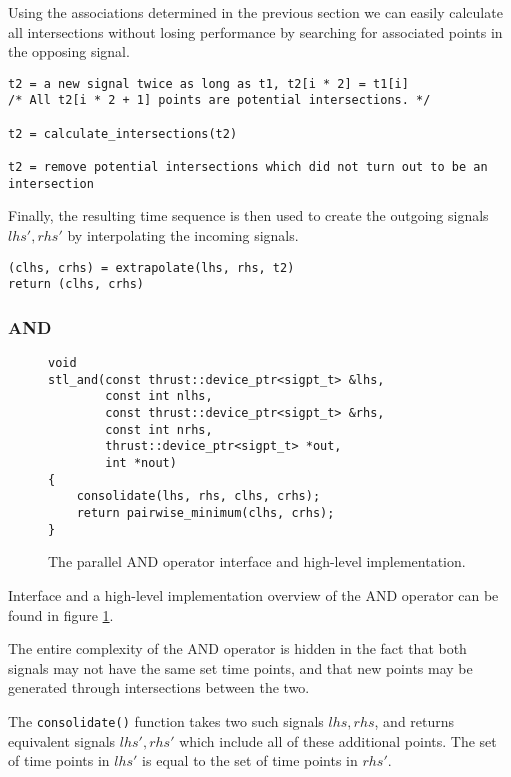 \documentclass[a4paper,10pt]{article}
\begin{document}
Using the associations determined in the previous section we can easily calculate
all intersections without losing performance by searching for associated points
in the opposing signal.

\begin{lstlisting}
t2 = a new signal twice as long as t1, t2[i * 2] = t1[i]
/* All t2[i * 2 + 1] points are potential intersections. */

t2 = calculate_intersections(t2)

t2 = remove potential intersections which did not turn out to be an intersection
\end{lstlisting}

Finally, the resulting time sequence is then used to create the outgoing signals
$lhs', rhs'$ by interpolating the incoming signals.

\begin{lstlisting}
(clhs, crhs) = extrapolate(lhs, rhs, t2)
return (clhs, crhs)
\end{lstlisting}

\subsubsection{AND}

\begin{figure}[ht]
\begin{lstlisting}
void
stl_and(const thrust::device_ptr<sigpt_t> &lhs,
        const int nlhs,
        const thrust::device_ptr<sigpt_t> &rhs,
        const int nrhs,
        thrust::device_ptr<sigpt_t> *out,
        int *nout)
{
	consolidate(lhs, rhs, clhs, crhs);
	return pairwise_minimum(clhs, crhs);
}
\end{lstlisting}
\caption{
\label{fig:parallel_and}
The parallel AND operator interface and high-level implementation.}
\end{figure}

Interface and a high-level implementation overview of the AND operator can be found 
in figure \ref{fig:parallel_and}.

The entire complexity of the AND operator is hidden in the fact that
both signals may not have the same set time points, and that new points
may be generated through intersections between the two.

The \lstinline|consolidate()|
function takes two such signals $lhs, rhs$, and returns equivalent signals $lhs', rhs'$ which include
all of these additional points. The set of time points in $lhs'$ is equal to the set
of time points in $rhs'$.
\end{document}
